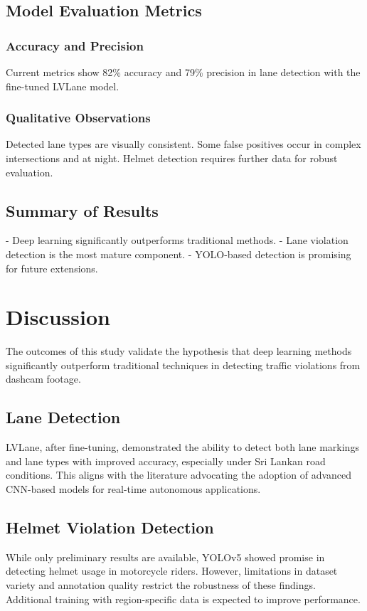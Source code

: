 \documentclass[12pt,a4paper]{article}
\begin{document}
\subsection{Model Evaluation Metrics}

\subsubsection{Accuracy and Precision}
Current metrics show 82\% accuracy and 79\% precision in lane detection with the fine-tuned LVLane model.

\subsubsection{Qualitative Observations}
Detected lane types are visually consistent. Some false positives occur in complex intersections and at night. Helmet detection requires further data for robust evaluation.

\subsection{Summary of Results}
- Deep learning significantly outperforms traditional methods.
- Lane violation detection is the most mature component.
- YOLO-based detection is promising for future extensions.

\section{Discussion}
The outcomes of this study validate the hypothesis that deep learning methods significantly outperform traditional techniques in detecting traffic violations from dashcam footage. 

\subsection{Lane Detection}
LVLane, after fine-tuning, demonstrated the ability to detect both lane markings and lane types with improved accuracy, especially under Sri Lankan road conditions. This aligns with the literature advocating the adoption of advanced CNN-based models for real-time autonomous applications.

\subsection{Helmet Violation Detection}
While only preliminary results are available, YOLOv5 showed promise in detecting helmet usage in motorcycle riders. However, limitations in dataset variety and annotation quality restrict the robustness of these findings. Additional training with region-specific data is expected to improve performance.
\end{document}
